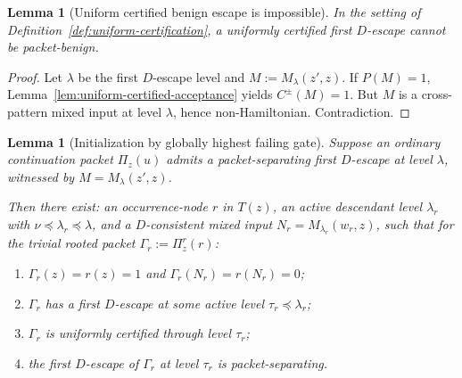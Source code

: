 \documentclass[11pt]{article}
\newtheorem{lemma}[theorem]{Lemma}
\begin{document}
\begin{lemma}[Uniform certified benign escape is impossible]
\label{lem:uniform-benign-impossible}
In the setting of Definition~\ref{def:uniform-certification}, a
uniformly certified first $D$-escape cannot be packet-benign.
\end{lemma}

\begin{proof}
Let $\lambda$ be the first $D$-escape level and $M := M_\lambda(z',z)$.
If $P(M) = 1$, Lemma~\ref{lem:uniform-certified-acceptance} yields
$C^\pm(M) = 1$.  But $M$ is a cross-pattern mixed input at level
$\lambda$, hence non-Hamiltonian.  Contradiction.
\end{proof}

\begin{lemma}[Initialization by globally highest failing gate]
\label{lem:initialization-highest-failing}
Suppose an ordinary continuation packet $\Pi_z(u)$ admits a
packet-separating first $D$-escape at level $\lambda$, witnessed by
$M = M_\lambda(z',z)$.

Then there exist: an occurrence-node $r$ in $T(z)$, an active descendant
level $\lambda_r$ with $\nu \preceq \lambda_r \preceq \lambda$, and a
$D$-consistent mixed input $N_r = M_{\lambda_r}(w_r, z)$, such that
for the trivial rooted packet $\Gamma_r := \Pi^r_z(r)$:
\begin{enumerate}
\item $\Gamma_r(z) = r(z) = 1$ and $\Gamma_r(N_r) = r(N_r) = 0$;
\item $\Gamma_r$ has a first $D$-escape at some active level
  $\tau_r \preceq \lambda_r$;
\item $\Gamma_r$ is uniformly certified through level $\tau_r$;
\item the first $D$-escape of $\Gamma_r$ at level $\tau_r$ is
  packet-separating.
\end{enumerate}
\end{lemma}
\end{document}
